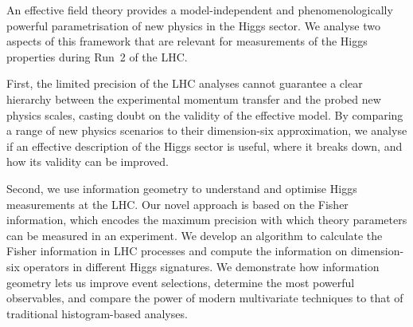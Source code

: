 An effective field theory provides a model-independent and
phenomenologically powerful parametrisation of new physics in the
Higgs sector. We analyse two aspects of this framework that are
relevant for measurements of the Higgs properties during Run~2 of the
LHC.

First, the limited precision of the LHC analyses cannot guarantee a
clear hierarchy between the experimental momentum transfer and
the probed new physics scales, casting doubt on the validity of the
effective model. By comparing a range of new physics scenarios to
their dimension-six approximation, we analyse if an effective
description of the Higgs sector is useful, where it breaks down, and
how its validity can be improved.

Second, we use information geometry to understand and optimise Higgs
measurements at the LHC. Our novel approach is based on the Fisher
information, which encodes the maximum precision with which theory
parameters can be measured in an experiment. We develop an algorithm
to calculate the Fisher information in LHC processes and compute the
information on dimension-six operators in different Higgs signatures.
We demonstrate how information geometry lets us improve event
selections, determine the most powerful observables, and compare the
power of modern multivariate techniques to that of traditional
histogram-based analyses.




